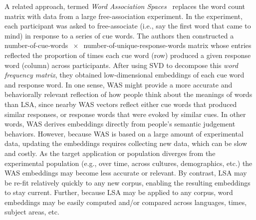 \documentclass{article}
\begin{document}
A related approach, termed \textit{Word Association Spaces}~\citep[WAS;][]{NelsEtal04, SteyEtal04} replaces the word count matrix with data from a large free-association experiment.  In the experiment, each participant was asked to free-associate (i.e., say the first word that came to mind) in response to a series of cue words.  The authors then constructed a number-of-cue-words $~\times~$ number-of-unique-response-words matrix whose entries reflected the proportion of times each cue word (row) produced a given response word (column) across participants.  After using SVD to decompose this \textit{word frequency matrix}, they obtained low-dimensional embeddings of each cue word and response word.  In one sense, WAS might provide a more accurate and behaviorally relevant reflection of how people think about the meanings of words than LSA, since nearby WAS vectors reflect either cue words that produced similar responses, or response words that were evoked by similar cues.  In other words, WAS derives embeddings directly from people's semantic judgement behaviors.  However, because WAS is based on a large amount of experimental data, updating the embeddings requires collecting new data, which can be slow and costly.  As the target application or population diverges from the experimental population (e.g., over time, across cultures, demographics, etc.) the WAS embeddings may become less accurate or relevant.  By contrast, LSA may be re-fit relatively quickly to any new corpus, enabling the resulting embeddings to stay current.  Further, because LSA may be applied to any corpus, word embeddings may be easily computed and/or compared across languages, times, subject areas, etc.
\end{document}
